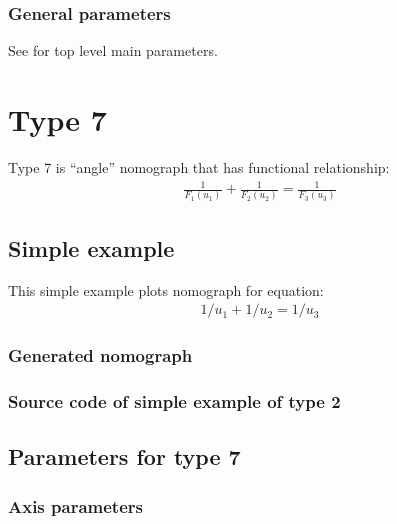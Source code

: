 \documentclass[a4paper,11pt,english]{sphinxmanual}
\begin{document}
\subsubsection{General parameters}
\label{\detokenize{types/types:id28}}
See {\hyperref[\detokenize{main_params:main-params}]{}} for top level main parameters.


\section{Type 7}
\label{\detokenize{types/types:type-7}}\label{\detokenize{types/types:type7-ref}}
Type 7 is “angle” nomograph that has functional relationship:
\begin{equation*}
\begin{split}\frac{1}{F_1(u_1)}+\frac{1}{F_2(u_2)}=\frac{1}{F_3(u_3)}\end{split}
\end{equation*}

\subsection{Simple example}
\label{\detokenize{types/types:id29}}
This simple example plots nomograph for equation:
\begin{equation*}
\begin{split}1/ u_1 + 1/u_2 = 1 / u_3\end{split}
\end{equation*}

\subsubsection{Generated nomograph}
\label{\detokenize{types/types:id30}}
\noindent{}


\subsubsection{Source code of simple example of type 2}
\label{\detokenize{types/types:id31}}

\subsection{Parameters for type 7}
\label{\detokenize{types/types:parameters-for-type-7}}

\subsubsection{Axis parameters}
\label{\detokenize{types/types:id32}}
\end{document}
